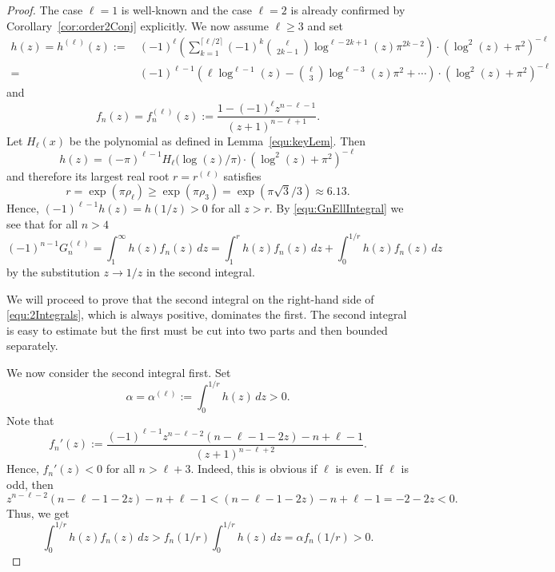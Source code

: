 \documentclass[11pt]{article}
\theoremstyle{plain}
\theoremstyle{definition}
\begin{document}
\begin{proof} The case $\ell=1$ is well-known and the case $\ell=2$ is already confirmed by Corollary~\ref{cor:order2Conj} explicitly. We now assume $\ell\ge 3$ and set
\begin{align*}
h(z)=h^{(\ell)}(z):= &\, (-1)^{\ell} \left( \sum_{k=1}^{\lceil \ell/2\rceil} (-1)^k \binom{\ell}{2k-1}
               \log^{\ell-2k+1}(z) \pi^{2k-2}  \right)\cdot  (\log^2(z)+\pi^2)^{-\ell} \\
=&\, (-1)^{\ell-1} \left(\ell \log^{\ell-1}(z)-\binom{\ell}{3} \log^{\ell-3}(z)\pi^2+ \cdots\right) \cdot  (\log^2(z)+\pi^2)^{-\ell}
\end{align*}
and
\begin{equation*}
f_n(z)=f_n^{(\ell)}(z):=\frac{1-(-1)^{\ell} z^{n-\ell-1}}{(z+1)^{n-\ell+1}}.
\end{equation*}
Let $H_\ell(x)$ be the polynomial as defined in Lemma~\ref{equ:keyLem}. Then
\begin{equation*}
h(z)=(-\pi)^{\ell-1}H_{\ell}\big(\log(z)/\pi\big) \cdot (\log^2(z)+\pi^2)^{-\ell}
\end{equation*}
and therefore its largest real root $r=r^{(\ell)}$ satisfies
\begin{equation*}
r=\exp(\pi \rho_\ell)\ge \exp(\pi \rho_3)=\exp(\pi\sqrt{3}/3)\approx 6.13.
\end{equation*}
Hence, $(-1)^{\ell-1} h(z) = h(1/z) >0$ for all $z>r$. By \eqref{equ:GnEllIntegral} we see that for all $n>4$
\begin{equation}\label{equ:2Integrals}
(-1)^{n-1} G_n^{(\ell)}
= \int_1^\infty h(z) f_n(z)\, dz
= \int_1^{r} h(z)  f_n(z)\, dz+\int_0^{1/r} h(z)  f_n(z)\, dz
\end{equation}
by the substitution $z\to 1/z$ in the second integral.

We will proceed to prove that the second integral on the right-hand side of \eqref{equ:2Integrals},
which is always positive, dominates the first. The second integral is easy to estimate
but the first must be cut into two parts and then bounded separately.

We now consider the second integral first. Set
\begin{equation}\label{equ:alpha}
\alpha=\alpha^{(\ell)}:=\int_0^{1/r}  h(z) \, dz>0.
\end{equation}
Note that
\begin{equation*}
     f_n'(z):=\frac{ (-1)^{\ell-1}z^{n-\ell-2}(n-\ell-1-2z)-n+\ell-1}{(z+1)^{n-\ell+2}}.
\end{equation*}
Hence, $f_n'(z)<0$ for all $n>\ell+3$. Indeed, this is obvious if $\ell$ is even. If $\ell$ is odd, then
\begin{equation*}
    z^{n-\ell-2}(n-\ell-1-2z)-n+\ell-1<(n-\ell-1-2z)-n+\ell-1=-2-2z<0.
\end{equation*}
Thus, we get
\begin{equation}\label{equ:2ndIntegralBd}
 \int_0^{1/r} h(z)  f_n(z)  \, dz > f_n(1/r) \int_0^{1/r}  h(z)  \, dz =\alpha f_n(1/r)>0.
\end{equation}


\end{proof}
\end{document}
